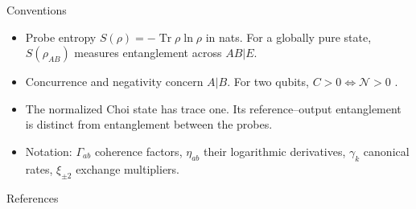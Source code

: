 \documentclass[aspectratio=169,11pt]{beamer}
\newcommand{\Tr}{\operatorname{Tr}}
\begin{document}
\begin{frame}{Conventions}
\small
\begin{itemize}\setlength\itemsep{6pt}
\item Probe entropy $S(\rho)=-\Tr\rho\ln\rho$ in nats. For a globally pure
state, $S(\rho_{AB})$ measures entanglement across $AB|E$.
\item Concurrence and negativity concern $A|B$. For two qubits,
$C>0\iff\mathcal N>0$ \cite{Wootters1998}.
\item The normalized Choi state has trace one. Its reference--output
entanglement is distinct from entanglement between the probes.
\item Notation: $\Gamma_{ab}$ coherence factors, $\eta_{ab}$ their
logarithmic derivatives, $\gamma_k$ canonical rates, $\xi_{\pm2}$ exchange
multipliers.
\end{itemize}
\end{frame}

\begin{frame}[allowframebreaks]{References}
\footnotesize
\nocite{Parisio2024,Vieira2026,Nielsen2002,Wootters1998,Hall2014}


\end{frame}
\end{document}
